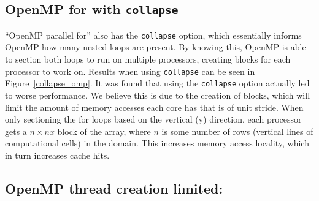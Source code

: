 \documentclass[12pt]{article}
\begin{document}
		
		
		\subsection{OpenMP for with \texttt{collapse}}
		``OpenMP parallel for'' also has the \texttt{collapse} option, which essentially informs OpenMP how many nested loops are present. By knowing this, OpenMP is able to section both loops to run on multiple processors, creating blocks for each processor to work on. Results when using \texttt{collapse} can be seen in Figure~\ref{collapse_omp}. It was found that using the \texttt{collapse} option actually led to worse performance. We believe this is due to the creation of blocks, which will limit the amount of memory accesses each core has that is of unit stride. When only sectioning the for loops based on the vertical (y) direction, each processor gets a $n \times nx$ block of the array, where $n$ is some number of rows (vertical lines of computational cells) in the domain. This increases memory access locality, which in turn increases cache hits.
			
			
		
		\subsection{OpenMP thread creation limited:}
		
\end{document}
